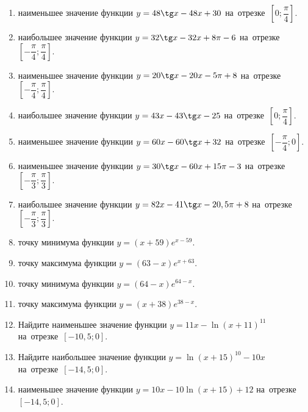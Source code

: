 \documentclass[a4paper,10pt]{article}
\begin{document}
\begin{enumerate}
\item {} наименьшее значение функции $y = 48\tg x-48x+30$ на~отрезке~$\left[0;\dfrac{\pi }{4}\right]$.

\item {} наибольшее значение функции $y=32\tg x-32x+8\pi -6$ на~отрезке~$\left[-\dfrac{\pi }{4};\dfrac{\pi }{4}\right]$.

\item {} наименьшее значение функции $y=20\tg x-20x-5\pi +8$ на~отрезке~$\left[-\dfrac{\pi }{4};\dfrac{\pi }{4}\right]$.

\item {} наибольшее значение функции $y = 43x-43\tg x -25$ на~отрезке~$\left[0;\dfrac{\pi }{4}\right]$.

\item {} наименьшее значение функции $y = 60x-60\tg x +32$ на~отрезке~$\left[-\dfrac{\pi }{4};0\right]$.

\item {} наименьшее значение функции $y = 30\tg x-60x+15 \pi -3$ на~отрезке~$\left[-\dfrac{\pi }{3};\dfrac{\pi }{3}\right]$.

\item {} наибольшее значение функции $y = 82x-41\tg x-20,5\pi +8$ на~отрезке~$\left[-\dfrac{\pi }{3};\dfrac{\pi }{3}\right]$.

\item {} точку минимума функции $y = \left(x+59\right)e^{x-59}$.

\item {} точку максимума функции $y = \left(63-x\right)e^{x+63}$.

\item {} точку минимума функции $y = \left(64-x\right)e^{64-x}$.

\item {} точку максимума функции $y = \left(x+38\right)e^{38-x}$.

\item Найдите наименьшее значение функции $y = 11x-\ln \left(x+11\right)^{11}$ на~отрезке~$\left[-10,5;0\right]$.

\item Найдите наибольшее значение функции $y = \ln \left(x+15\right)^{10}-10x$ на~отрезке~$\left[-14,5;0\right]$.

\item {} наименьшее значение функции $y = 10x-10\ln \left(x+15\right) +12$ на~отрезке~$\left[-14,5;0\right]$.


\end{enumerate}
\end{document}
